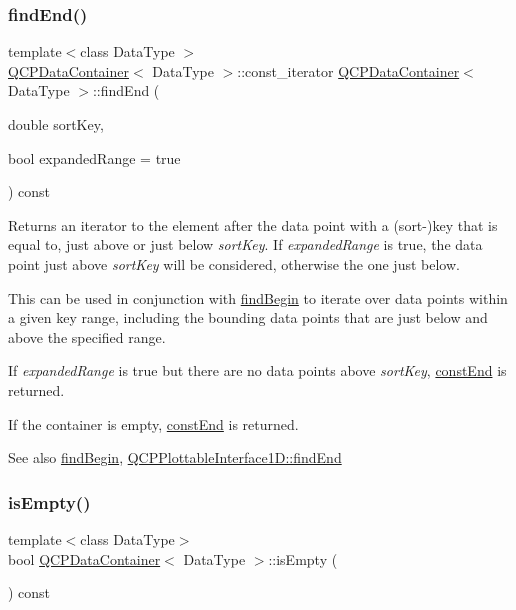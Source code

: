 \subsubsection{\texorpdfstring{find\+End()}{findEnd()}}
{\footnotesize\ttfamily template$<$class Data\+Type $>$ \\
\mbox{\hyperlink{class_q_c_p_data_container}{Q\+C\+P\+Data\+Container}}$<$ Data\+Type $>$\+::const\+\_\+iterator \mbox{\hyperlink{class_q_c_p_data_container}{Q\+C\+P\+Data\+Container}}$<$ Data\+Type $>$\+::find\+End (\begin{DoxyParamCaption}\item[{double}]{sort\+Key,  }\item[{bool}]{expanded\+Range = {\ttfamily true} }\end{DoxyParamCaption}) const}

Returns an iterator to the element after the data point with a (sort-\/)key that is equal to, just above or just below {\itshape sort\+Key}. If {\itshape expanded\+Range} is true, the data point just above {\itshape sort\+Key} will be considered, otherwise the one just below.

This can be used in conjunction with \mbox{\hyperlink{class_q_c_p_data_container_a2ad8a5399072d99a242d3a6d2d7e278a}{find\+Begin}} to iterate over data points within a given key range, including the bounding data points that are just below and above the specified range.

If {\itshape expanded\+Range} is true but there are no data points above {\itshape sort\+Key}, \mbox{\hyperlink{class_q_c_p_data_container_aa7f7cf239b85b1a28de3d675cc5b3da1}{const\+End}} is returned.

If the container is empty, \mbox{\hyperlink{class_q_c_p_data_container_aa7f7cf239b85b1a28de3d675cc5b3da1}{const\+End}} is returned.

\begin{DoxySeeAlso}{See also}
\mbox{\hyperlink{class_q_c_p_data_container_a2ad8a5399072d99a242d3a6d2d7e278a}{find\+Begin}}, \mbox{\hyperlink{class_q_c_p_plottable_interface1_d_a5deced1016bc55a41a2339619045b295}{Q\+C\+P\+Plottable\+Interface1\+D\+::find\+End}} 
\end{DoxySeeAlso}
\mbox{\label{class_q_c_p_data_container_a7bdebfccd2f9f84bf032882f9d6b00a8}} 
\subsubsection{\texorpdfstring{is\+Empty()}{isEmpty()}}
{\footnotesize\ttfamily template$<$class Data\+Type$>$ \\
bool \mbox{\hyperlink{class_q_c_p_data_container}{Q\+C\+P\+Data\+Container}}$<$ Data\+Type $>$\+::is\+Empty (\begin{DoxyParamCaption}{ }\end{DoxyParamCaption}) const\hspace{0.3cm}{\ttfamily [inline]}}

